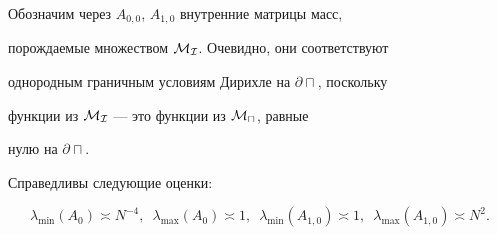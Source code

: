 Обозначим через $A_{0,0}$, $A_{1,0}$ внутренние матрицы масс,


порождаемые множеством $\cal M_I$. Очевидно, они соответствуют


однородным граничным условиям Дирихле на $\partial\sqcap$, поскольку


функции из $\cal M_I$ --- это функции из $\cal M_\sqcap$, равные


нулю на $\partial\sqcap$.





\begin{lems}


Справедливы следующие оценки$:$


\begin{equation}


\lambda_{\min}(A_0)\asymp N^{-4},\ \;


\lambda_{\max}(A_0)\asymp 1,\ \;


\lambda_{\min}(A_{1,0})\asymp 1,\ \;


\lambda_{\max}(A_{1,0}) \asymp N^2.


\end{equation}


\end{lems}





